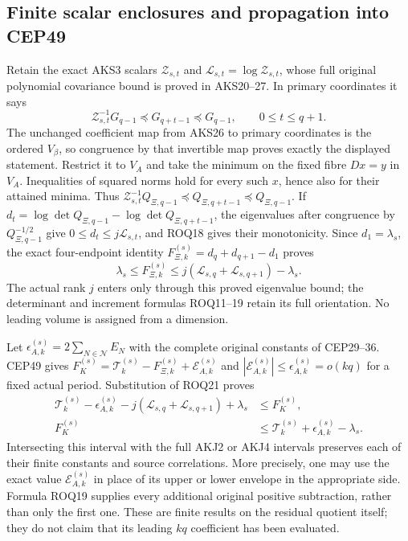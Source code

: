 \documentclass[11pt,a4paper]{article}
\begin{document}
\subsection{Finite scalar enclosures and propagation into CEP49}

Retain the exact AKS3 scalars $\mathcal Z_{s,t}$ and
$\mathcal L_{s,t}=\log\mathcal Z_{s,t}$, whose full original polynomial
covariance bound is proved in AKS20--27. In primary coordinates it says
\[
 \mathcal Z_{s,t}^{-1}G_{q-1}\preceq G_{q+t-1}\preceq G_{q-1},
                  \qquad 0\le t\le q+1.
 \tag{ROQ20}
\]
The unchanged coefficient map from AKS26 to primary coordinates is
the ordered $V_\beta$, so congruence by that invertible map proves
exactly the displayed statement. Restrict it to $V_A$ and take the
minimum on the fixed fibre $Dx=y$ in $V_A$. Inequalities of squared
norms hold for every such $x$, hence also for their attained minima.
Thus
$\mathcal Z_{s,t}^{-1}Q_{\Xi,q-1}\preceq Q_{\Xi,q+t-1}
\preceq Q_{\Xi,q-1}$.
If $d_t=\log\det Q_{\Xi,q-1}-\log\det Q_{\Xi,q+t-1}$,
the eigenvalues after congruence by $Q_{\Xi,q-1}^{-1/2}$ give
$0\le d_t\le j\mathcal L_{s,t}$, and ROQ18 gives their monotonicity.
Since $d_1=\lambda_s$, the exact four-endpoint identity
$F_{\Xi,k}^{(s)}=d_q+d_{q+1}-d_1$ proves
\[
 \lambda_s\le F_{\Xi,k}^{(s)}
       \le j(\mathcal L_{s,q}+\mathcal L_{s,q+1})-\lambda_s.
 \tag{ROQ21}
\]
The actual rank $j$ enters only through this proved eigenvalue bound;
the determinant and increment formulas ROQ11--19 retain its full
orientation. No leading volume is assigned from a dimension.

Let $\epsilon_{A,k}^{(s)}=2\sum_{N\in\mathcal N}E_N$ with the
complete original constants of CEP29--36. CEP49 gives
$F_K^{(s)}=\mathcal T_k^{(s)}-F_{\Xi,k}^{(s)}+
\mathcal E_{A,k}^{(s)}$ and
$|\mathcal E_{A,k}^{(s)}|\le\epsilon_{A,k}^{(s)}=o(kq)$
for a fixed actual period. Substitution of ROQ21 proves
\[
 \begin{split}
 \mathcal T_k^{(s)}-\epsilon_{A,k}^{(s)}
       -j(\mathcal L_{s,q}+\mathcal L_{s,q+1})+\lambda_s
       &\le F_K^{(s)},\\
 F_K^{(s)}&\le
          \mathcal T_k^{(s)}+\epsilon_{A,k}^{(s)}-\lambda_s.
 \end{split}\tag{ROQ22}
\]
Intersecting this interval with the full AKJ2 or AKJ4 intervals preserves
each of their finite constants and source correlations. More precisely,
one may use the exact value $\mathcal E_{A,k}^{(s)}$ in place of its
upper or lower envelope in the appropriate side. Formula ROQ19 supplies
every additional original positive subtraction, rather than only the
first one. These are finite results on the residual quotient itself;
they do not claim that its leading $kq$ coefficient has been evaluated.
\end{document}

